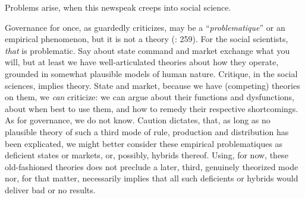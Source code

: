 \documentclass[11pt,a4paper,oneside,openright]{article}
\begin{document}
Problems arise, when this newspeak creeps into social science. 

Governance for once, as \citeauthor{Jachtenfuchs2001} guardedly criticizes, may be a ``\emph{problematique}'' or an empirical phenomenon, but it is not a theory (\citeyear{Jachtenfuchs2001}: 259). For the social scientists, \emph{that} is problematic. Say about state command and market exchange what you will, but at least we have well-articulated theories about how they operate, grounded in somewhat plausible models of human nature. Critique, in the social sciences, implies theory. State and market, because we have (competing) theories on them, we \emph{can} criticize: we can argue about their functions and dysfunctions, about when best to use them, and how to remedy their respective shortcomings. As for governance, we do not know. Caution dictates, that, as long as no plausible theory of such a third mode of rule, production and distribution has been explicated, we might better consider these empirical problematiques as deficient states or markets, or, possibly, hybrids thereof. Using, for now, these old-fashioned theories does not preclude a later, third, genuinely theorized mode nor, for that matter, necessarily implies that all such deficients or hybrids would deliver bad or no results.
\end{document}
